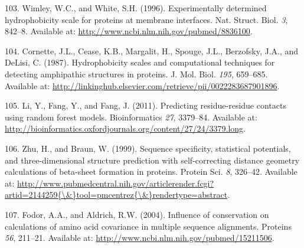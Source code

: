 \documentclass[12pt,a4paper,twoside]{book}
\theoremstyle{definition}
\theoremstyle{definition}
\theoremstyle{remark}
\begin{document}
\hypertarget{ref-Wimley1996}{}
103. Wimley, W.C., and White, S.H. (1996). Experimentally determined
hydrophobicity scale for proteins at membrane interfaces. Nat. Struct.
Biol. \emph{3}, 842--8. Available at:
\url{http://www.ncbi.nlm.nih.gov/pubmed/8836100}.

\hypertarget{ref-Cornette1987}{}
104. Cornette, J.L., Cease, K.B., Margalit, H., Spouge, J.L., Berzofsky,
J.A., and DeLisi, C. (1987). Hydrophobicity scales and computational
techniques for detecting amphipathic structures in proteins. J. Mol.
Biol. \emph{195}, 659--685. Available at:
\url{http://linkinghub.elsevier.com/retrieve/pii/0022283687901896}.

\hypertarget{ref-Li2011}{}
105. Li, Y., Fang, Y., and Fang, J. (2011). Predicting residue-residue
contacts using random forest models. Bioinformatics \emph{27}, 3379--84.
Available at:
\url{http://bioinformatics.oxfordjournals.org/content/27/24/3379.long}.

\hypertarget{ref-Zhu1999}{}
106. Zhu, H., and Braun, W. (1999). Sequence specificity, statistical
potentials, and three-dimensional structure prediction with
self-correcting distance geometry calculations of beta-sheet formation
in proteins. Protein Sci. \emph{8}, 326--42. Available at:
\href{http://www.pubmedcentral.nih.gov/articlerender.fcgi?artid=2144259\%7B/\&\%7Dtool=pmcentrez\%7B/\&\%7Drendertype=abstract}{http://www.pubmedcentral.nih.gov/articlerender.fcgi?artid=2144259\{\textbackslash{}\&\}tool=pmcentrez\{\textbackslash{}\&\}rendertype=abstract}.

\hypertarget{ref-Fodor2004a}{}
107. Fodor, A.A., and Aldrich, R.W. (2004). Influence of conservation on
calculations of amino acid covariance in multiple sequence alignments.
Proteins \emph{56}, 211--21. Available at:
\url{http://www.ncbi.nlm.nih.gov/pubmed/15211506}.
\end{document}
